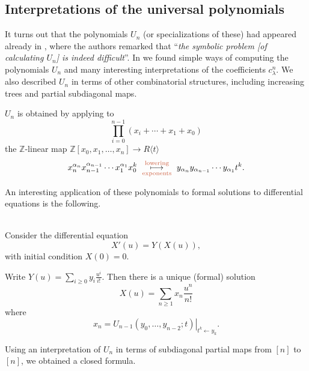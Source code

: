 \documentclass{commat}
\newcommand\ds{\displaystyle}
\newcommand{\ZZ}{\mathbb{Z}}
\newcommand{\eval}[2]{\left. #1 \right|_{#2}}
\newcommand\cred[1]{{\color{vermDM}#1}}
\begin{document}
\subsection{Interpretations of the universal polynomials}\label{S:comb:comp}

It turns out that the polynomials $U_n$ (or specializations of these) had appeared already in \cite{BF12}, where the authors remarked that ``\textit{the symbolic problem [of calculating $U_n$] is indeed difficult}''. In \cite{BLR20} we found simple ways of computing the polynomials $U_n$ and many interesting interpretations of the coefficients $c^n_{\lambda}$. We also described $U_n$ in terms of other combinatorial structures, including increasing trees and partial subdiagonal maps. 

\begin{theorem}
	$U_n$ is obtained by applying 
	to 
	\begin{equation*}%
		\prod_{i=0}^{n-1} \left( x_{i}+ \cdots + x_1 + x_0\right)
	\end{equation*}
	the $\ZZ$-linear map $\ZZ[x_0, x_1,\ldots,x_n]\longrightarrow R\langle t \rangle$ 
	\[
	x_n^{\alpha_n} x_{n-1}^{\alpha_{n-1}} \cdots x_1^{\alpha_1}x_0^k \ 
	\overset{\cred{\mbox{\scriptsize lowering}}}{\underset{\cred{\mbox{\scriptsize exponents}}}{\longmapsto}} \ y_{\alpha_n} y_{\alpha_{n-1}} \cdots y_{\alpha_1}t^k.
	\] 
\end{theorem}

An interesting application of these polynomials to formal solutions to differential equations is the following.

\begin{example}[Solution to the differential equation $X'(u)=Y(X(u))$]\hfill\\
	Consider the differential equation
	\[ X'(u)=Y(X(u)),\] 
	with initial condition $X(0)=0$.
	
	
	Write
	$\ds
	Y(u)=\sum_{i\geq 0} y_i \frac{u^i}{i!}$. Then there is a unique (formal) solution
	\begin{equation*}
		X(u)=\sum_{n\geq 1} x_n \frac{u^n}{n!} 
	\end{equation*}
	where
	\begin{equation*}
		x_n=\eval{U_{n-1}(y_0, \ldots, y_{n-2};t)}{t^k\leftarrow y_k}.
	\end{equation*}
\end{example}

Using an interpretation of $U_n$ in terms of subdiagonal partial maps from $[n]$ to $[n]$, we obtained a closed formula.
\end{document}
